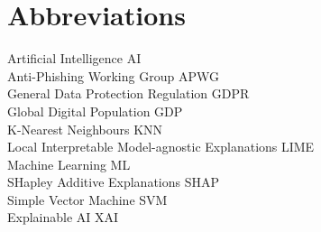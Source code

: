 \section*{Abbreviations}

\large
Artificial Intelligence \hfill AI\\
Anti-Phishing Working Group \hfill APWG\\
General Data Protection Regulation \hfill GDPR\\
Global Digital Population \hfill GDP\\
K-Nearest Neighbours \hfill KNN\\
Local Interpretable Model-agnostic Explanations \hfill LIME\\
Machine Learning \hfill ML\\
SHapley Additive Explanations \hfill SHAP\\
Simple Vector Machine \hfill SVM\\
Explainable AI \hfill XAI\\

